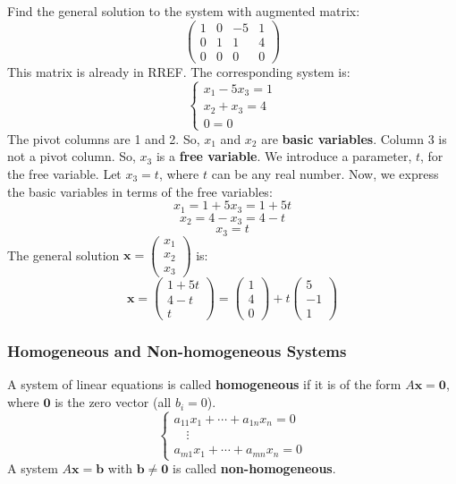 \begin{example}
Find the general solution to the system with augmented matrix:
\[
\left(\begin{array}{ccc|c}
1 & 0 & -5 & 1 \\
0 & 1 & 1 & 4 \\
0 & 0 & 0 & 0
\end{array}\right)
\]
This matrix is already in RREF. The corresponding system is:
\[
\begin{cases}
x_1 - 5x_3 = 1 \\
x_2 + x_3 = 4 \\
0 = 0
\end{cases}
\]
The pivot columns are 1 and 2. So, $x_1$ and $x_2$ are \textbf{basic variables}.
Column 3 is not a pivot column. So, $x_3$ is a \textbf{free variable}.
We introduce a parameter, $t$, for the free variable. Let $x_3 = t$, where $t$ can be any real number.
Now, we express the basic variables in terms of the free variables:
\[ x_1 = 1 + 5x_3 = 1 + 5t \]
\[ x_2 = 4 - x_3 = 4 - t \]
\[ x_3 = t \]
The general solution $\mathbf{x} = \begin{pmatrix} x_1 \\ x_2 \\ x_3 \end{pmatrix}$ is:
\[ \mathbf{x} = \begin{pmatrix} 1 + 5t \\ 4 - t \\ t \end{pmatrix} = \begin{pmatrix} 1 \\ 4 \\ 0 \end{pmatrix} + t \begin{pmatrix} 5 \\ -1 \\ 1 \end{pmatrix} \]
\end{example}

\subsubsection{Homogeneous and Non-homogeneous Systems}

\begin{definition}
A system of linear equations is called \textbf{homogeneous} if it is of the form $A\mathbf{x} = \mathbf{0}$, where $\mathbf{0}$ is the zero vector (all $b_i = 0$).
\[
\begin{cases}
a_{11}x_1 + \cdots + a_{1n}x_n = 0\\
\quad \vdots \\
a_{m1}x_1 + \cdots + a_{mn}x_n = 0
\end{cases}
\]
A system $A\mathbf{x} = \mathbf{b}$ with $\mathbf{b} \neq \mathbf{0}$ is called \textbf{non-homogeneous}.
\end{definition}

